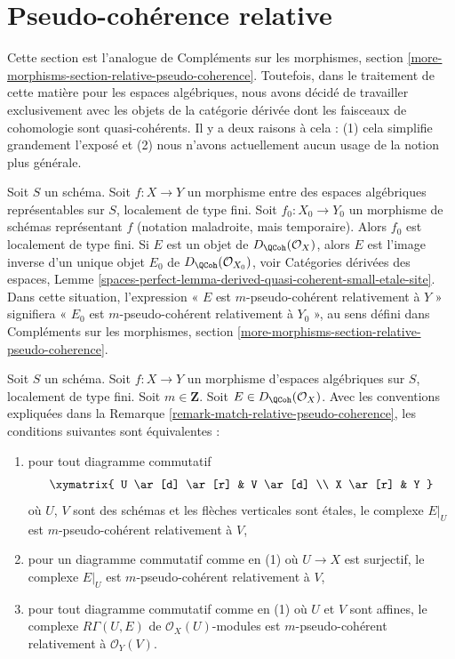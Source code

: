 \section{Pseudo-cohérence relative}
\label{section-relative-pseudo-coherence}

\noindent
Cette section est l'analogue de
Compléments sur les morphismes, section
\ref{more-morphisms-section-relative-pseudo-coherence}.
Toutefois, dans le traitement de cette matière pour les
espaces algébriques, nous avons décidé de travailler exclusivement
avec les objets de la catégorie dérivée dont les faisceaux de cohomologie
sont quasi-cohérents. Il y a deux raisons à cela :
(1) cela simplifie grandement l'exposé et
(2) nous n'avons actuellement aucun usage de la notion plus générale.

\begin{remark}
\label{remark-match-relative-pseudo-coherence}
Soit $S$ un schéma. Soit $f : X \to Y$ un morphisme entre des espaces algébriques
représentables sur $S$, localement de type fini. Soit
$f_0 : X_0 \to Y_0$ un morphisme de schémas représentant $f$
(notation maladroite, mais temporaire). Alors $f_0$ est localement de type fini.
Si $E$ est un objet de $D_\QCoh(\mathcal{O}_X)$, alors $E$
est l'image inverse d'un unique objet $E_0$ de $D_\QCoh(\mathcal{O}_{X_0})$, voir
Catégories dérivées des espaces, Lemme
\ref{spaces-perfect-lemma-derived-quasi-coherent-small-etale-site}.
Dans cette situation, l'expression « $E$ est $m$-pseudo-cohérent relativement à $Y$ »
signifiera « $E_0$ est $m$-pseudo-cohérent relativement à $Y_0$ »,
au sens défini dans Compléments sur les morphismes, section
\ref{more-morphisms-section-relative-pseudo-coherence}.
\end{remark}

\begin{lemma}
\label{lemma-qcoh-relative-pseudo-coherence-characterize}
Soit $S$ un schéma. Soit $f : X \to Y$ un morphisme d'espaces algébriques
sur $S$, localement de type fini. Soit $m \in \mathbf{Z}$.
Soit $E \in D_\QCoh(\mathcal{O}_X)$. Avec les conventions expliquées dans la
Remarque \ref{remark-match-relative-pseudo-coherence},
les conditions suivantes sont équivalentes :
\begin{enumerate}
\item pour tout diagramme commutatif
$$
\xymatrix{
U \ar[d] \ar[r] & V \ar[d] \\
X \ar[r] & Y
}
$$
où $U$, $V$ sont des schémas et les flèches verticales sont étales, le complexe
$E|_U$ est $m$-pseudo-cohérent relativement à $V$,
\item pour un diagramme commutatif comme en (1) où $U \to X$ est
surjectif, le complexe $E|_U$ est $m$-pseudo-cohérent relativement à $V$,
\item pour tout diagramme commutatif comme en (1) où $U$ et $V$ sont
affines, le complexe $R\Gamma(U, E)$ de $\mathcal{O}_X(U)$-modules
est $m$-pseudo-cohérent relativement à $\mathcal{O}_Y(V)$.
\end{enumerate}
\end{lemma}

